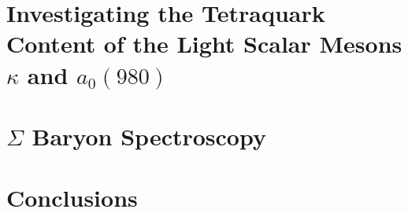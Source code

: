 \documentclass[12pt]{report}
\begin{document}
% 

\chapter{Investigating the Tetraquark Content of the Light Scalar Mesons $\kappa$ and $a_0(980)$}\label{ch:tetraquarks}


\chapter{$\Sigma$ Baryon Spectroscopy}

\chapter{Conclusions}




\end{document}
